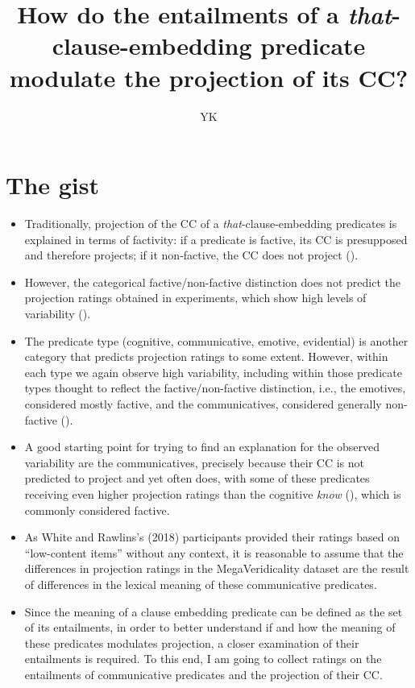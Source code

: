 \documentclass[11pt,fleqn]{article}
\title{How do the entailments of a \emph{that}-clause-embedding predicate modulate the projection of its CC?}
\author{YK}
\newcommand{\6}{\mbox{$[\hspace*{-.6mm}[$}}
\newcommand{\9}{\mbox{$]\hspace*{-.6mm}]$}}
\begin{document}
\maketitle

\section{The gist}
\begin{itemize}
\item Traditionally, projection of the CC of a \emph{that}-clause-embedding predicates is explained in terms of factivity: if a predicate is factive, its CC is presupposed and therefore projects; if it non-factive, the CC does not project (\citealt{kiparsky-kiparsky70}). 
\item However, the categorical factive/non-factive distinction does not predict the projection ratings obtained in experiments, which show high levels of variability (\citealt{degen-tonhauser-language}). 
\item The predicate type (cognitive, communicative, emotive, evidential) is another category that predicts projection ratings to some extent. However, within each type we again observe high variability, including within those predicate types thought to reflect the factive/non-factive distinction, i.e., the emotives, considered mostly factive, and the communicatives, considered generally non-factive (\citealt{anand-hacquard2014}).
\item A good starting point for trying to find an explanation for the observed variability are the communicatives, precisely because their CC is not predicted to project and yet often does, with some of these predicates receiving even higher projection ratings than the cognitive \emph{know} (\citealt{white-rawlins-nels2018}), which is commonly considered factive. 
\item As White and Rawlins’s (2018) participants provided their ratings based on “low-content items” without any context, it is reasonable to assume that the differences in projection ratings in the MegaVeridicality dataset are the result of differences in the lexical meaning of these communicative predicates. 
\item Since the meaning of a clause embedding predicate can be defined as the set of its entailments, in order to better understand if and how the meaning of these predicates modulates projection, a closer examination of their entailments is required.
To this end, I am going to collect ratings on the entailments of communicative predicates and the projection of their CC.
\end{itemize}
\end{document}
